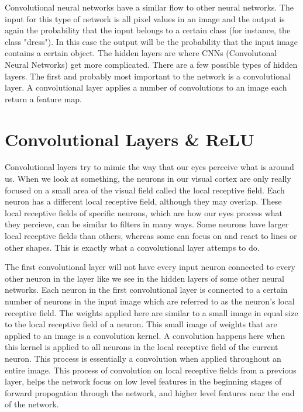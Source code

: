 \documentclass[12pt]{report} %
\begin{document}
	Convolutional neural networks have a similar flow to other neural networks. The input for this type of network is all pixel values in an image and the output is again the probability that the input belongs to a certain class (for instance, the class "dress"). In this case the output will be the probability that the input image contains a certain object. The hidden layers are where CNNs (Convolutonal Neural Networks) get more complicated. There are a few possible types of hidden layers. The first and probably most important to the network is a convolutional layer. A convolutional layer applies a number of convolutions to an image each return a feature map\cite{aurelienMachineLearning}. 

\section{Convolutional Layers \& ReLU}
	
	Convolutional layers try to mimic the way that our eyes perceive what is around us. When we look at something, the neurons in our visual cortex are only really focused on a small area of the visual field called the local receptive field. Each neuron has a different local receptive field, although they may overlap. These local receptive fields of specific neurons, which are how our eyes process what they percieve, can be similar to filters in many ways. Some neurons have larger local receptive fields than others, whereas some can focus on and react to lines or other shapes. This is exactly what a convolutional layer attemps to do.\cite{aurelienMachineLearning} 
	
	The first convolutional layer will not have every input neuron connected to every other neuron in the layer like we see in the hidden layers of some other neural networks. Each neuron in the first convolutional layer is connected to a certain number of neurons in the input image which are referred to as the neuron's local receptive field. The weights applied here are similar to a small image in equal size to the local receptive field of a neuron. This small image of weights that are applied to an image is a convolution kernel. A convolution happens here when this kernel is applied to all neurons in the local receptive field of the current neuron. This process is essentially a convolution when applied throughout an entire image. This process of convolution on local receptive fields from a previous layer, helps the network focus on low level features in the beginning stages of forward propogation through the network, and higher level features near the end of the network.\cite{aurelienMachineLearning} 
	
\end{document}
